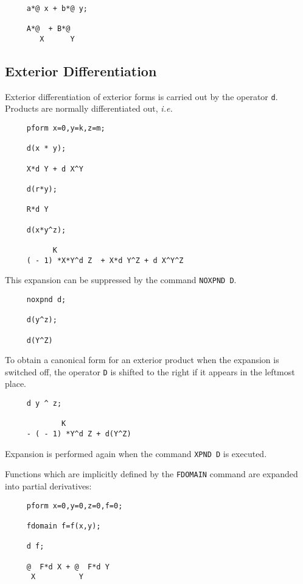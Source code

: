 \example{}

\begin{verbatim}
     a*@ x + b*@ y;

     A*@  + B*@
        X      Y
\end{verbatim}

\subsection{Exterior Differentiation}
Exterior differentiation of exterior forms is carried out by the
operator {\tt d}\label{d}.  Products are normally differentiated out,
{\em i.e.}

\begin{verbatim}
     pform x=0,y=k,z=m;

     d(x * y);

     X*d Y + d X^Y

     d(r*y);

     R*d Y

     d(x*y^z);

           K
     ( - 1) *X*Y^d Z  + X*d Y^Z + d X^Y^Z
\end{verbatim}

This expansion can be suppressed by the command \texttt{NOXPND D}\label{NOXPNDD}.

\begin{verbatim}
     noxpnd d;

     d(y^z);

     d(Y^Z)
\end{verbatim}

To obtain a canonical form for an exterior product when the expansion
is switched off, the operator {\tt D} is shifted to the right if it
appears in the leftmost place.

\begin{verbatim}
     d y ^ z;

             K
     - ( - 1) *Y^d Z + d(Y^Z)
\end{verbatim}

Expansion is performed again when the command {\tt XPND D}\label{XPNDD}
is executed. 

Functions which are implicitly defined by the {\tt FDOMAIN} command are
expanded into partial derivatives:

\begin{verbatim}
     pform x=0,y=0,z=0,f=0;

     fdomain f=f(x,y);

     d f;

     @  F*d X + @  F*d Y
      X          Y
\end{verbatim}

